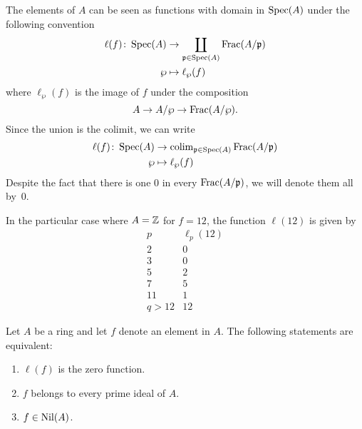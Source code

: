 \begin{rem}\label{rem:defn-of-ell}
    The elements of $A$ can be seen as functions with domain in $\operatorname{Spec}(A)$ under the following convention
    \begin{align*}
        \ell(f)\colon\operatorname{Spec}(A)
            &\to\coprod_{\mathfrak p\in\operatorname{Spec}(A)}\operatorname{Frac}(A/\mathfrak p)\\
            \wp &\mapsto\ell_\wp(f)
    \end{align*}
    where $\ell_\wp(f)$ is the image of $f$ under the composition
    $$
        A\to A/\wp\to\operatorname{Frac}(A/\wp).
    $$
    Since the union is the colimit, we can write
    \begin{align*}
        \ell(f)\colon\operatorname{Spec}(A)
            &\to\operatorname{colim}_{\mathfrak p\in\operatorname{Spec}(A)}\operatorname{Frac}(A/\mathfrak p)\\
            \wp &\mapsto\ell_{\wp}(f)
    \end{align*}
    Despite the fact that there is one $0$ in every $\operatorname{Frac}(A/\mathfrak p)$, we will denote them all by~$0$.
\end{rem}

\begin{xmpl}
    In the particular case where $A=\mathbb{Z}$ for $f=12$, the function $\ell(12)$ is given by
    $$
        \begin{array}{c|c}
            p&\ell_p(12)\\
            \hline
             2& 0\\
             3& 0\\
             5& 2\\
             7& 5\\
             11&1\\
             q>12&12
        \end{array}
    $$
\end{xmpl}

\begin{thm}\label{thm:nilpotency-characterizations}
    Let\/ $A$ be a ring and let $f$ denote an element in $A$. The following statements are equivalent:
    \begin{enumerate}[\rm a)]
        \item $\ell(f)$ is the zero function.
        \item $f$ belongs to every prime ideal of\/ $A$.
        \item $f\in\operatorname{Nil}(A)$.
    \end{enumerate}
\end{thm}

